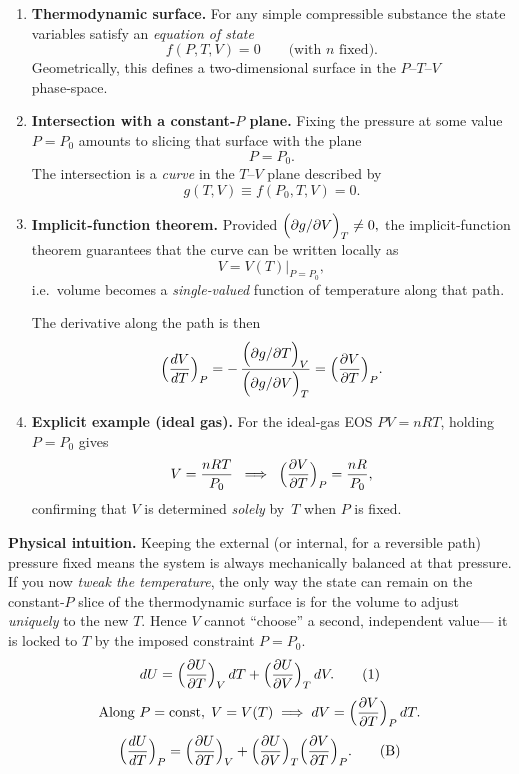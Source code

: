 \documentclass[12pt]{article}
\theoremstyle{definition} %
\theoremstyle{plain} %
\begin{document}
\begin{enumerate}
\item \textbf{Thermodynamic surface.}\;
   For any simple compressible substance the state variables satisfy an
   \emph{equation of state}
   \[
     f(P,T,V)=0
     \qquad\bigl(\text{with $n$ fixed}\bigr).
   \]
   Geometrically, this defines a two‑dimensional surface in the $P$–$T$–$V$ phase‑space.

\item \textbf{Intersection with a constant‑$P$ plane.}\;
   Fixing the pressure at some value $P=P_0$ amounts to slicing that surface with the plane
   \[
     P = P_0.
   \]
   The intersection is a \emph{curve} in the $T$–$V$ plane described by
   \[
     g(T,V)\equiv f(P_0,T,V)=0.
   \]

\item \textbf{Implicit‑function theorem.}\;
   Provided
   \(\displaystyle \Bigl(\partial g/\partial V\Bigr)_{T}\neq0,\)
   the implicit‑function theorem guarantees that the curve can be written locally as
   \[
     V = V(T)\bigl|_{P=P_0},
   \]
   i.e.\ volume becomes a \emph{single‑valued} function of temperature along that path.

   The derivative along the path is then
   \[
     \Bigl(\frac{dV}{dT}\Bigr)_{P}
       = -\,\frac{\displaystyle\Bigl(\partial g/\partial T\Bigr)_{V}}
                {\displaystyle\Bigl(\partial g/\partial V\Bigr)_{T}}
       = \Bigl(\frac{\partial V}{\partial T}\Bigr)_{P}.
   \]

\item \textbf{Explicit example (ideal gas).}\;
   For the ideal‑gas EOS $PV=nRT$,
   holding $P=P_0$ gives
   \[
     V=\frac{nRT}{P_0}\;\;\Longrightarrow\;\;
     \Bigl(\frac{\partial V}{\partial T}\Bigr)_{P}
       =\frac{nR}{P_0},
   \]
   confirming that $V$ is determined \emph{solely} by~$T$ when $P$ is fixed.

\end{enumerate}

\medskip
\noindent
\textbf{Physical intuition.}\;
Keeping the external (or internal, for a reversible path) pressure fixed means the
system is always mechanically balanced at that pressure.
If you now \emph{tweak the temperature}, the only way the state can remain on the
constant‑$P$ slice of the thermodynamic surface is for the volume to adjust
\emph{uniquely} to the new $T$. Hence $V$ cannot “choose” a second, independent value—%
it is locked to $T$ by the imposed constraint $P=P_0$.
\[
dU
  = \Bigl(\frac{\partial U}{\partial T}\Bigr)_{V}\,dT
  + \Bigl(\frac{\partial U}{\partial V}\Bigr)_{T}\,dV.
\tag{1}
\]
\[
\text{Along }P=\text{const},\;V = V(T)\;\Longrightarrow\;
dV = \Bigl(\frac{\partial V}{\partial T}\Bigr)_{P}\,dT.
\]
\[
\Bigl(\frac{dU}{dT}\Bigr)_{P}
  = \Bigl(\frac{\partial U}{\partial T}\Bigr)_{V}
  + \Bigl(\frac{\partial U}{\partial V}\Bigr)_{T}
    \Bigl(\frac{\partial V}{\partial T}\Bigr)_{P}.
\tag{B}
\]
\end{document}
